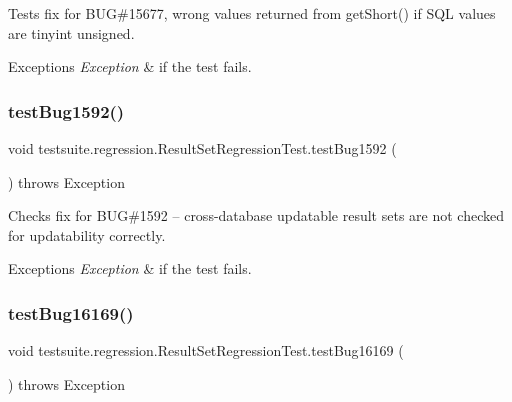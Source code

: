 Tests fix for B\+UG\#15677, wrong values returned from get\+Short() if S\+QL values are tinyint unsigned.


\begin{DoxyExceptions}{Exceptions}
{\em Exception} & if the test fails. \\
\hline
\end{DoxyExceptions}
\mbox{\label{classtestsuite_1_1regression_1_1_result_set_regression_test_a5f550a75e1f4f38d642553a5115f9257}} 
\subsubsection{\texorpdfstring{test\+Bug1592()}{testBug1592()}}
{\footnotesize\ttfamily void testsuite.\+regression.\+Result\+Set\+Regression\+Test.\+test\+Bug1592 (\begin{DoxyParamCaption}{ }\end{DoxyParamCaption}) throws Exception}

Checks fix for B\+UG\#1592 -- cross-\/database updatable result sets are not checked for updatability correctly.


\begin{DoxyExceptions}{Exceptions}
{\em Exception} & if the test fails. \\
\hline
\end{DoxyExceptions}
\mbox{\label{classtestsuite_1_1regression_1_1_result_set_regression_test_afd1a4f6cb3b76fec4eed7cd2b0aa84ed}} 
\subsubsection{\texorpdfstring{test\+Bug16169()}{testBug16169()}}
{\footnotesize\ttfamily void testsuite.\+regression.\+Result\+Set\+Regression\+Test.\+test\+Bug16169 (\begin{DoxyParamCaption}{ }\end{DoxyParamCaption}) throws Exception}

